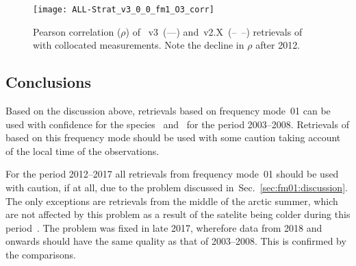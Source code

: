 \begin{figure}[ht]
    \centering
    \texttt{[image: ALL-Strat\_v3\_0\_0\_fm1\_O3\_corr]}
    \caption{Pearson correlation ($\rho$) of \smr~v3~(---) and~v2.X~(--~--)
    retrievals of  with collocated measurements. Note the decline in
    $\rho$ after 2012.}
    \label{fig:fm01:O3:corr}
\end{figure}

\subsection{Conclusions}
\label{sec:fm01:conclusions}
Based on the discussion above, retrievals based on frequency mode~01 can be
used with confidence for the species~ and~ for the
period 2003--2008. Retrievals of  based on this frequency mode
should be used with some caution taking account of the local time of the
observations.

For the period 2012--2017  all retrievals from frequency mode~01 should be used
with  caution, if at all, due to the problem discussed
in~Sec.~\ref{sec:fm01:discussion}. The only exceptions are retrievals from the
middle of the arctic summer, which are not affected by this problem as a result
of the satelite being colder during this period~\cite{postlaunch:2006}. The
problem was fixed in late 2017, wherefore data from 2018 and onwards should
have the same quality as that of 2003--2008. This is confirmed by the comparisons.